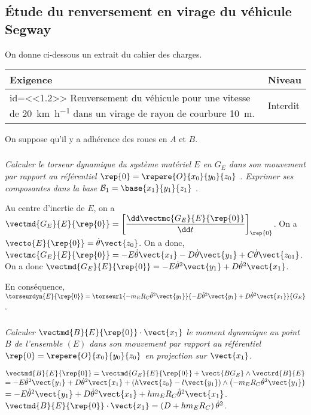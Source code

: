 \begin{multicols}{2}
\subsection*{Étude du renversement en virage du véhicule Segway}
\ifprof
\else
On donne ci-dessous un extrait du cahier des charges.


\begin{center}
\begin{tabular}{|p{.7\linewidth}|p{.2\linewidth}|}
\hline 
Exigence & Niveau \\
\hline
id=<<1.2>> Renversement du véhicule pour une vitesse de \SI{20}{km.h^{-1}} dans un virage de rayon de courbure \SI{10}{m}.
& Interdit \\
\hline
\end{tabular}
\end{center}

\begin{hypo}
On suppose qu’il y a adhérence des roues en $A$ et $B$.
\end{hypo}
\fi

\ifnormal
\subparagraph{}\textit{Calculer le torseur dynamique du système matériel $E$ en $G_E$ dans son mouvement par rapport au référentiel $\rep{0}=\repere{O}{x_0}{y_0}{z_0}$ . Exprimer ses composantes dans la base $\mathcal{B}_1=\base{x_1}{y_1}{z_1}$ .}
\else
\fi
\ifprof
\begin{corrige}
Au centre d'inertie de $E$, on a $\vectmd{G_E}{E}{\rep{0}}=\left[\dfrac{\dd \vectmc{G_E}{E}{\rep{0}}}{\dd t}\right]_{\rep{0}}$. On a $\vecto{E}{\rep{0}}=\dot{\theta}\vect{z_0}$. On a donc, $ \vectmc{G_E}{E}{\rep{0}}=-E\dot{\theta}\vect{x_1}-D\dot{\theta}\vect{y_1}+C\dot{\theta}\vect{z_{01}}$.
On a donc $\vectmd{G_E}{E}{\rep{0}}=-E\dot{\theta}^2\vect{y_1}+D\dot{\theta}^2\vect{x_1}$.

En conséquence, $\torseurdyn{E}{\rep{0}}=\torseurl{-m_E R_C\dot{\theta}^2\vect{y_1}}{-E\dot{\theta}^2\vect{y_1}+D\dot{\theta}^2\vect{x_1}}{G_E}$.
\end{corrige}
\else
\fi

\ifnormal
\subparagraph{}\textit{Calculer $\vectmd{B}{E}{\rep{0}}\cdot \vect{x_1}$ le moment dynamique au point $B$ de l’ensemble $(E)$ dans son mouvement par rapport au référentiel $\rep{0}=\repere{O}{x_0}{y_0}{z_0}$ en projection sur $\vect{x_1}$.}
\else
\fi

\ifprof
\begin{corrige}
$\vectmd{B}{E}{\rep{0}}=\vectmd{G_E}{E}{\rep{0}}+\vect{BG_E}\wedge\vectrd{B}{E}$ $=-E\dot{\theta}^2\vect{y_1}+D\dot{\theta}^2\vect{x_1}+\left( h \vect{z_0}-l\vect{y_1}\right) \wedge \left( {-m_E R_C\dot{\theta}^2\vect{y_1}} \right)$
$=-E\dot{\theta}^2\vect{y_1}+D\dot{\theta}^2\vect{x_1}+ h m_E R_C\dot{\theta}^2\vect{x_1}$.
$\vectmd{B}{E}{\rep{0}}\cdot \vect{x_1}=\left(D+ h m_E R_C\right)\dot{\theta}^2$.


\end{corrige}
\end{multicols}
